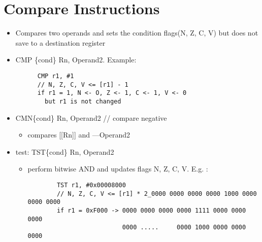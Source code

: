 \section{Compare Instructions}
  \begin{itemize}
    \item Compares two operands and sets the condition flags(N, Z, C, V) but does not
    save to a destination register\\
    \item CMP \{cond\} Rn, Operand2. Example:
    \begin{lstlisting}
      CMP r1, #1
      // N, Z, C, V <= [r1] - 1
      if r1 = 1, N <- O, Z <- 1, C <- 1, V <- 0
        but r1 is not changed
    \end{lstlisting}

    \item CMN\{cond\} Rn, Operand2 // compare negative
    \begin{itemize}
      \item compares [[Rn]] and ---Operand2
    \end{itemize}
    \item test: TST\{cond\} Rn, Operand2
    \begin{itemize}
      \item perform bitwise AND and updates flags N, Z, C, V. E.g. :
      \begin{lstlisting}
        TST r1, #0x00008000
        // N, Z, C, V <= [r1] * 2_0000 0000 0000 0000 1000 0000 0000 0000
        if r1 = 0xF000 -> 0000 0000 0000 0000 1111 0000 0000 0000
                          0000 .....     0000 1000 0000 0000 0000
      \end{lstlisting}
    \end{itemize}


\end{itemize}
